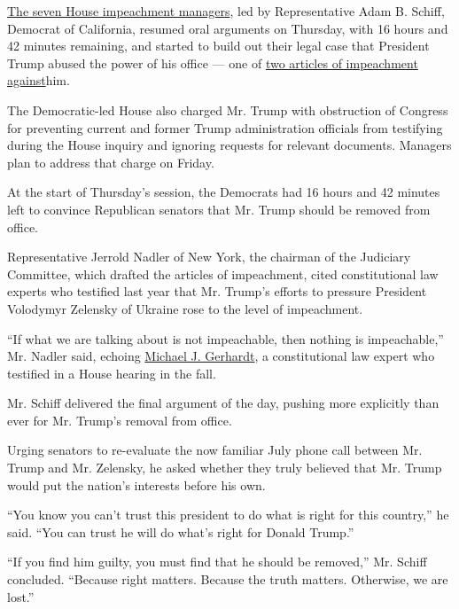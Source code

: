 \href{https://www.nytimes3xbfgragh.onion/2020/01/22/us/impeachment-managers.html?action=click\&module=Top\%20Stories\&pgtype=Homepage}{The
seven House impeachment managers}, led by Representative Adam B. Schiff,
Democrat of California, resumed oral arguments on Thursday, with 16
hours and 42 minutes remaining, and started to build out their legal
case that President Trump abused the power of his office --- one of
\href{https://www.nytimes3xbfgragh.onion/interactive/2019/12/10/us/politics/articles-impeachment-document-pdf.html}{two
articles of impeachment against}him.

The Democratic-led House also charged Mr. Trump with obstruction of
Congress for preventing current and former Trump administration
officials from testifying during the House inquiry and ignoring requests
for relevant documents. Managers plan to address that charge on Friday.

At the start of Thursday's session, the Democrats had 16 hours and 42
minutes left to convince Republican senators that Mr. Trump should be
removed from office.

Representative Jerrold Nadler of New York, the chairman of the Judiciary
Committee, which drafted the articles of impeachment, cited
constitutional law experts who testified last year that Mr. Trump's
efforts to pressure President Volodymyr Zelensky of Ukraine rose to the
level of impeachment.

``If what we are talking about is not impeachable, then nothing is
impeachable,'' Mr. Nadler said, echoing
\href{https://www.nytimes3xbfgragh.onion/2019/12/04/us/politics/michael-gerhardt.html}{Michael
J. Gerhardt}, a constitutional law expert who testified in a House
hearing in the fall.

Mr. Schiff delivered the final argument of the day, pushing more
explicitly than ever for Mr. Trump's removal from office.

Urging senators to re-evaluate the now familiar July phone call between
Mr. Trump and Mr. Zelensky, he asked whether they truly believed that
Mr. Trump would put the nation's interests before his own.

``You know you can't trust this president to do what is right for this
country,'' he said. ``You can trust he will do what's right for Donald
Trump.''

``If you find him guilty, you must find that he should be removed,'' Mr.
Schiff concluded. ``Because right matters. Because the truth matters.
Otherwise, we are lost.''

